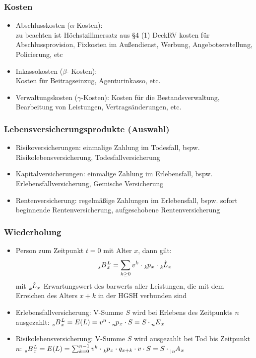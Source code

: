 \documentclass[12pt]{report}
\theoremstyle{dotless}
\theoremstyle{definition}
\begin{document}
\subsubsection{Kosten}
\begin{itemize}
\item Abschlusskosten ($\alpha$-Kosten):\\
zu beachten ist Höchstzillmersatz aus §4 (1) DeckRV kosten für Abschlussprovision, Fixkosten im Außendienst, Werbung, Angebotserstellung, Policierung, etc
\item Inkassokosten ($\beta$- Kosten):\\
Kosten für Beitragseinzug, Agenturinkasso, etc.
\item Verwaltungskosten ($\gamma$-Kosten):
Kosten für die Bestandsverwaltung, Bearbeitung von Leistungen, Vertragsänderungen, etc.
\end{itemize}

\subsubsection{Lebensversicherungsprodukte (Auswahl)}
\begin{itemize}
\item Risikoversicherungen: einmalige Zahlung im Todesfall, bspw. Risikolebensversicherung, Todesfallversicherung
\item Kapitalversicherungen: einmalige Zahlung im Erlebensfall, bspw. Erlebensfallversicherung, Gemische Versicherung
\item Rentenversicherung: regelmäßige Zahlungen im Erlebensfall, bspw. sofort beginnende Rentenversicherung, aufgeschobene Rentenversicherung
\end{itemize}

\subsubsection{Wiederholung}
\begin{itemize}
\item Person zum Zeitpunkt $t=0$ mit Alter $x$, dann gilt:
\begin{equation}
\tensor[_{s}]{B}{}_x^L = \sum_{k\geq 0} v^k \cdot \tensor[_k]{p}{}_x \cdot \tensor[_k]{\hat{L}}{}_x
\end{equation}
mit $\tensor[_k]{\hat{L}}{}_x$ Erwartungswert des barwerts aller Leistungen, die mit dem Erreichen des Alters $x+k$ in der HGSH verbunden sind

\item Erlebensfallversicherung: V-Summe $S$ wird bei Erlebens des Zeitpunkts $n$ ausgezahlt: $\tensor[_{s}]{B}{}_x^L = E(L) = v^n \cdot \tensor[_n]{p}{}_x\cdot S = S \cdot \tensor[_n]{E}{}_x$
\item Risikolebensversicherung: V-Summe $S$ wird ausgezahlt bei Tod bis Zeitpunkt $n$: $\tensor[_{s}]{B}{}_x^L = E(L) = \sum_{k=0}^{n-1} v^k \cdot \tensor[_k]{p}{}_x \cdot q_{x+k} \cdot v \cdot S = S \cdot \tensor[_{|n}]{A}{}_x$
\end{itemize}
\end{document}
